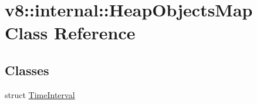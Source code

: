 \hypertarget{classv8_1_1internal_1_1HeapObjectsMap}{}\section{v8\+:\+:internal\+:\+:Heap\+Objects\+Map Class Reference}
\label{classv8_1_1internal_1_1HeapObjectsMap}
\subsection*{Classes}
\begin{DoxyCompactItemize}
\item 
struct \mbox{\hyperlink{structv8_1_1internal_1_1HeapObjectsMap_1_1TimeInterval}{Time\+Interval}}
\end{DoxyCompactItemize}

